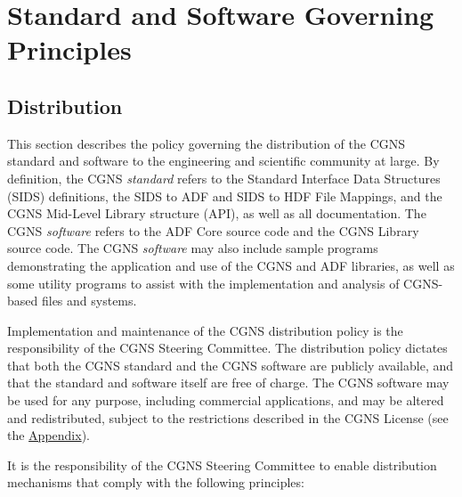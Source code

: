 \section{Standard and Software Governing Principles}
\label{s:principles}
\thispagestyle{plain}

\subsection{Distribution}
\label{s:distribution}

This section describes the policy governing the distribution of the
CGNS standard and software to the engineering and scientific community
at large.
By definition, the CGNS \textit{standard} refers to the
Standard Interface Data Structures
(SIDS) definitions, the SIDS to ADF and SIDS to HDF
File Mappings, and the CGNS Mid-Level
Library structure (API), as well as all documentation.
The CGNS \textit{software} refers to the ADF Core source code and the CGNS
Library source code.
The CGNS \textit{software} may also include sample programs
demonstrating the application and use of the CGNS and ADF libraries,
as well as some utility programs to assist with the implementation and
analysis of CGNS-based files and systems.

Implementation and maintenance of the CGNS distribution policy is the
responsibility of the CGNS Steering Committee.
The distribution policy dictates that both the CGNS standard and the
CGNS software are publicly available, and that the standard and software
itself are free of charge.
The CGNS software may be used for any purpose, including commercial
applications, and may be altered and redistributed, subject to the
restrictions described in the CGNS License (see the
\hyperref[s:license]{Appendix}).

It is the responsibility of the CGNS Steering Committee to enable
distribution mechanisms that comply with the following principles:

